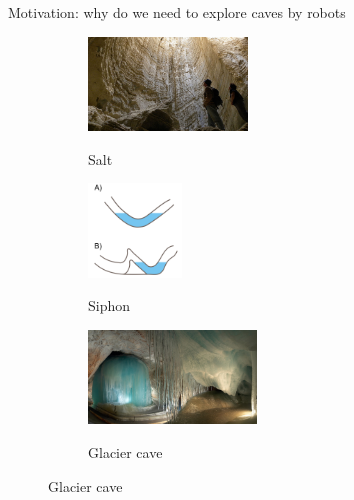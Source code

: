 \documentclass[aspectratio=169]{beamer}
\begin{document}
\begin{frame}[t]{Motivation: why do we need to explore caves by robots}
    \vspace{-0.55cm}
    \begin{figure}[H]
        \begin{subfigure}[b]{0.3\textwidth}
            \centering\includegraphics[height=2.5cm]{surface_types/salt.jpg}\\
            \caption*{Salt}
            \label{fig:salt}
        \end{subfigure}
        \hfill
        \begin{subfigure}[b]{0.3\textwidth}
            \centering\includegraphics[height=2.5cm]{surface_types/siphon.png}\\
            \caption*{Siphon}
            \label{fig:siphon}
        \end{subfigure}
        \hfill
        \begin{subfigure}[b]{0.3\textwidth}
            \centering\includegraphics[height=2.5cm]{surface_types/ice.png}\\
            \caption*{Glacier cave}
            \label{fig:ice}
        \end{subfigure}


\end{figure}
\end{frame}
\end{document}
